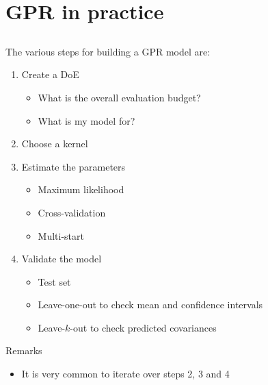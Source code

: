 \documentclass{beamer}
\begin{document}
\section{GPR in practice}
\subsection{}

\begin{frame}{}
The various steps for building a GPR model are:\\ 
\vspace{3mm}
\begin{enumerate}
	\item Create a DoE
		\begin{itemize}
			\item What is the overall evaluation budget?
			\item What is my model for?
		\end{itemize} \vspace{2mm}
	\item Choose a kernel \vspace{3mm}
	\item Estimate the parameters
		\begin{itemize}
			\item Maximum likelihood
			\item Cross-validation
			\item Multi-start
		\end{itemize} \vspace{2mm}
	\item Validate the model 
		\begin{itemize}
			\item Test set 
			\item Leave-one-out to check mean and confidence intervals
			\item Leave-$k$-out to check predicted covariances
		\end{itemize}
\end{enumerate}
\begin{exampleblock}{Remarks}
	\begin{itemize}
		\item It is very common to iterate over steps 2, 3 and 4
	\end{itemize}
\end{exampleblock}
\end{frame}
\end{document}
